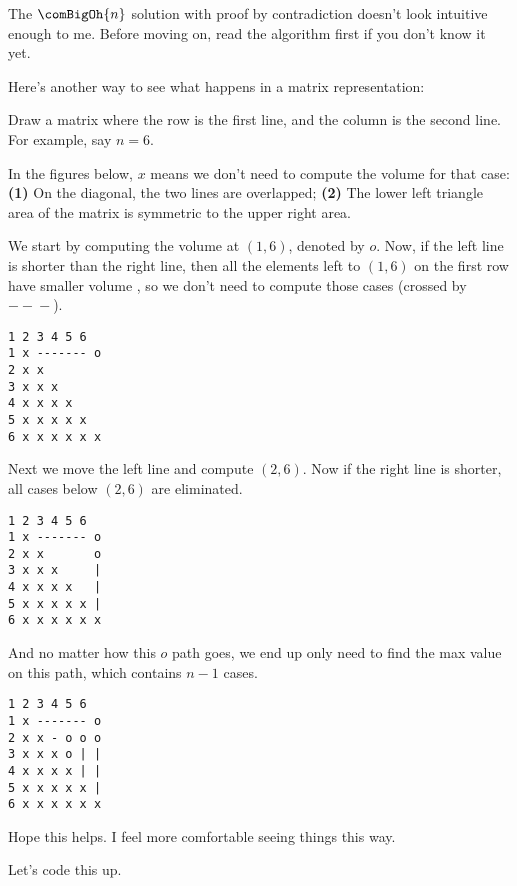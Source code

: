 \rrsepline{}

The $\comBigOh{n}$ solution with proof by contradiction doesn't look
intuitive enough to me. Before moving on, read the algorithm first if you
don't know it yet.

Here's another way to see what happens in a matrix representation:

Draw a matrix where the row is the first line, and the column is the second
line. For example, say $n=6$.

In the figures below, $x$ means we don't need to compute the volume for that
case: \textbf{(1)} On the diagonal, the two lines are overlapped;
\textbf{(2)} The lower left triangle area of the matrix is symmetric to the
upper right area.

We start by computing the volume at $(1,6)$, denoted by $o$. Now, if the
left line is shorter than the right line, then all the elements left to
$(1,6)$ on the first row have smaller volume , so we don't need to compute those cases
(crossed by $-{}-{}-$).
\begin{lstlisting}[style=raygeneric]
  1 2 3 4 5 6
1 x ------- o
2 x x
3 x x x 
4 x x x x
5 x x x x x
6 x x x x x x
\end{lstlisting}
Next we move the left line and compute $(2,6)$. Now if the right line is
shorter, all cases below $(2,6)$ are eliminated. 
\begin{lstlisting}[style=raygeneric]
  1 2 3 4 5 6
1 x ------- o
2 x x       o
3 x x x     |
4 x x x x   |
5 x x x x x |
6 x x x x x x
\end{lstlisting}
And no matter how this $o$ path goes, we end up only need to find the max
value on this path, which contains $n-1$ cases.
\begin{lstlisting}[style=raygeneric]
  1 2 3 4 5 6
1 x ------- o
2 x x - o o o
3 x x x o | |
4 x x x x | |
5 x x x x x |
6 x x x x x x
\end{lstlisting}
Hope this helps. I feel more comfortable seeing things this way.

Let's code this up.





















































